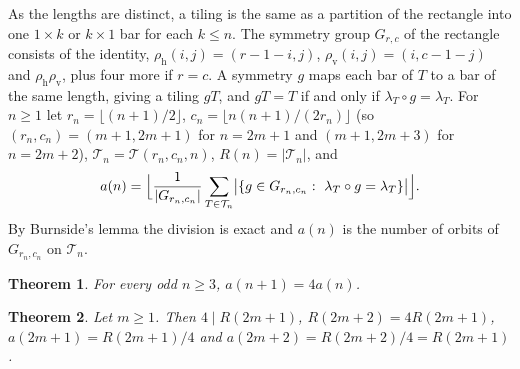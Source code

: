 \documentclass[11pt]{amsart}
\theoremstyle{plain}
\newtheorem{theorem}{Theorem}
\theoremstyle{definition}
\newcommand{\T}{\mathcal{T}}
\begin{document}
As the lengths are distinct, a tiling is the same as a partition of the rectangle into one $1\times k$ or $k\times1$ bar for each $k\le n$. The symmetry group $G_{r,c}$ of the rectangle consists of the identity, $\rho_{\mathrm h}(i,j)=(r-1-i,j)$, $\rho_{\mathrm v}(i,j)=(i,c-1-j)$ and $\rho_{\mathrm h}\rho_{\mathrm v}$, plus four more if $r=c$. A symmetry $g$ maps each bar of $T$ to a bar of the same length, giving a tiling $gT$, and $gT=T$ if and only if $\lambda_T\circ g=\lambda_T$. For $n\ge1$ let $r_n=\lfloor(n+1)/2\rfloor$, $c_n=\lfloor n(n+1)/(2r_n)\rfloor$ (so $(r_n,c_n)=(m+1,2m+1)$ for $n=2m+1$ and $(m+1,2m+3)$ for $n=2m+2$), $\T_n=\T(r_n,c_n,n)$, $R(n)=|\T_n|$, and
\begin{equation}\label{eq:a}
  a(n)=\Bigl\lfloor\frac{1}{|G_{r_n,c_n}|}\sum_{T\in\T_n}\bigl|\{g\in G_{r_n,c_n}:\ \lambda_T\circ g=\lambda_T\}\bigr|\Bigr\rfloor .
\end{equation}
By Burnside's lemma the division is exact and $a(n)$ is the number of orbits of $G_{r_n,c_n}$ on $\T_n$.

\begin{theorem}\label{thm:main}
For every odd $n\ge3$, $a(n+1)=4a(n)$.
\end{theorem}

\begin{theorem}\label{thm:precise}
Let $m\ge1$. Then $4\mid R(2m+1)$, $R(2m+2)=4R(2m+1)$, $a(2m+1)=R(2m+1)/4$ and $a(2m+2)=R(2m+2)/4=R(2m+1)$.
\end{theorem}
\end{document}
